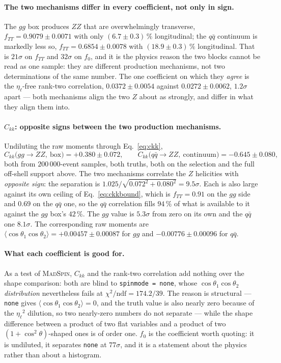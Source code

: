 \documentclass[a4paper,11pt]{article}
\providecommand{\ms}{{\textsc{MadSpin}}}
\providecommand{\code}[1]{\texttt{#1}}
\providecommand{\etal}{\ensuremath{\eta_\ell}}          %
\providecommand{\ckk}{\ensuremath{C_{kk}}}              %
\begin{document}
\paragraph{The two mechanisms differ in every coefficient, not only in sign.}
The $gg$ box produces $ZZ$ that are overwhelmingly transverse,
$f_{TT}=0.9079\pm0.0071$ with only $(6.7\pm0.3)\,\%$ longitudinal; the $q\bar q$
continuum is markedly less so, $f_{TT}=0.6854\pm0.0078$ with
$(18.9\pm0.3)\,\%$ longitudinal. That is $21\sigma$ on $f_{TT}$ and $32\sigma$
on $f_0$, and it is the physics reason the two blocks cannot be read as one
sample: they are different production mechanisms, not two determinations of the
same number. The one coefficient on which they \emph{agree} is the
$\etal$-free rank-two correlation, $0.0372\pm0.0054$ against
$0.0272\pm0.0062$, $1.2\sigma$ apart --- both mechanisms align the two $Z$
about as strongly, and differ in what they align them into.

\paragraph{$\ckk$: opposite signs between the two production mechanisms.}
Undiluting the raw moments through Eq.~\eqref{eq:ckk},
\begin{equation}
  \ckk\big(gg\to ZZ,\ \text{box}\big)=+0.380\pm0.072,
  \qquad
  \ckk\big(q\bar q\to ZZ,\ \text{continuum}\big)=-0.645\pm0.080,
  \label{eq:ckknumbers}
\end{equation}
both from $200\,000$-event samples, both truths, both on the selection and the
full off-shell support above. The two mechanisms correlate the $Z$ helicities
with \emph{opposite sign}: the separation is
$1.025/\sqrt{0.072^2+0.080^2}=9.5\sigma$. Each is also large against its own
ceiling of Eq.~\eqref{eq:ckkbound}, which is $f_{TT}=0.91$ on the $gg$ side and
$0.69$ on the $q\bar q$ one, so the $q\bar q$ correlation fills $94\,\%$ of
what is available to it against the $gg$ box's $42\,\%$. The $gg$ value is $5.3\sigma$ from zero on its own and the $q\bar q$
one $8.1\sigma$. The corresponding raw moments are
$\langle\cos\theta_1\cos\theta_2\rangle=+0.00457\pm0.00087$ for $gg$ and
$-0.00776\pm0.00096$ for $q\bar q$.

\paragraph{What each coefficient is good for.} As a test of \ms, $\ckk$ and the
rank-two correlation add nothing over the shape comparison: both are blind to
\code{spinmode = none}, whose $\cos\theta_1\cos\theta_2$ \emph{distribution}
nevertheless fails at $\chi^2/\mathrm{ndf}=174.2/39$. The reason is structural
--- \code{none} gives $\langle\cos\theta_1\cos\theta_2\rangle=0$, and the truth
value is also nearly zero because of the $\etal^2$ dilution, so two nearly-zero
numbers do not separate --- while the shape difference between a product of two
flat variables and a product of two $(1+\cos^2\theta)$-shaped ones is of order
one. $f_0$ is the coefficient worth quoting: it is undiluted, it separates
\code{none} at $77\sigma$, and it is a statement about the physics rather than
about a histogram.
\end{document}
